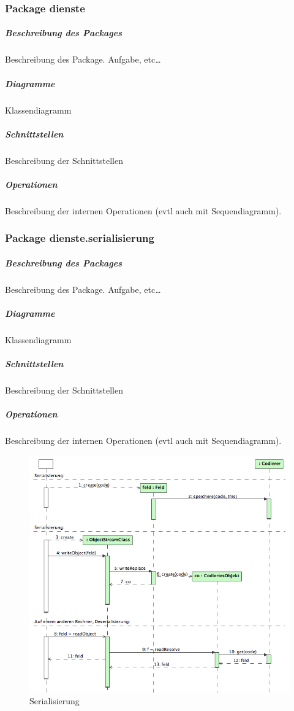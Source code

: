 \documentclass[a4paper,12pt,halfparskip,DIV14]{scrartcl}
\begin{document}
\newpage
\subsubsection{Package dienste} %
\label{ssub:package_dienste}
\subparagraph{Beschreibung des Packages} %
\label{ssub:beschreibung_des_packages}
Beschreibung des Package. Aufgabe, etc…
\subparagraph{Diagramme} %
\label{ssub:diagramme}
Klassendiagramm
\subparagraph{Schnittstellen} %
\label{ssub:schnittstellen}
Beschreibung der Schnittstellen
\subparagraph{Operationen} %
\label{ssub:operationen}
Beschreibung der internen Operationen (evtl auch mit Sequendiagramm).

\newpage
\subsubsection{Package dienste.serialisierung} %
\label{ssub:package_dienste_serialisierung}
\subparagraph{Beschreibung des Packages} %
\label{ssub:beschreibung_des_packages}
Beschreibung des Package. Aufgabe, etc…
\subparagraph{Diagramme} %
\label{ssub:diagramme}
Klassendiagramm
\subparagraph{Schnittstellen} %
\label{ssub:schnittstellen}
Beschreibung der Schnittstellen
\subparagraph{Operationen} %
\label{ssub:operationen}
Beschreibung der internen Operationen (evtl auch mit Sequendiagramm).
\begin{figure}
	[htp] \centering 
	\includegraphics[width=1\textwidth]{dienste_serialisierung.png} \caption{Serialisierung}\label{fig:dienste_serialisierung.png} 
\end{figure}
\end{document}
